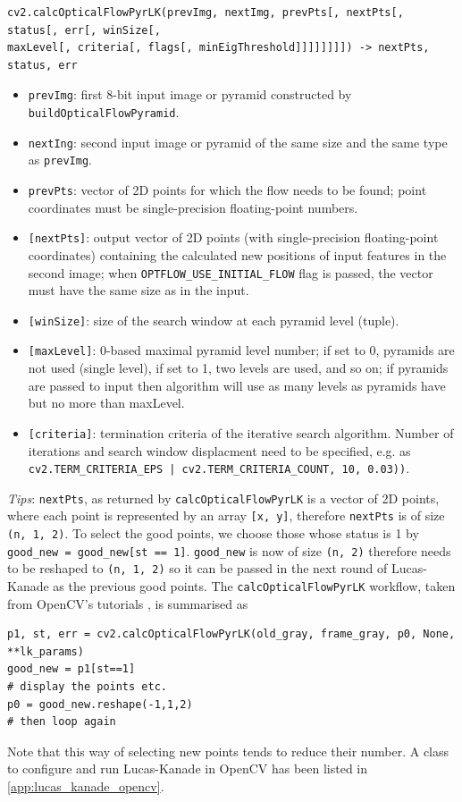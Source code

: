 \documentclass[a4paper]{article}
\begin{document}
\begin{verbatim}
cv2.calcOpticalFlowPyrLK(prevImg, nextImg, prevPts[, nextPts[, status[, err[, winSize[,
maxLevel[, criteria[, flags[, minEigThreshold]]]]]]]]) -> nextPts, status, err
\end{verbatim}
\begin{itemize}
    \item \texttt{prevImg}: first 8-bit input image or pyramid constructed by \texttt{buildOpticalFlowPyramid}. 
    \item \texttt{nextIng}: second input image or pyramid of the same size and the same type as \texttt{prevImg}. 
    \item \texttt{prevPts}: vector of 2D points for which the flow needs to be found; point coordinates must be single-precision floating-point numbers. 
    \item \texttt{[nextPts]}: output vector of 2D points (with single-precision floating-point coordinates) containing the calculated new positions of input features in the second image; when \texttt{OPTFLOW_USE_INITIAL_FLOW} flag is passed, the vector must have the same size as in the input. 
    \item \texttt{[winSize]}: size of the search window at each pyramid level (tuple).
    \item \texttt{[maxLevel]}: 0-based maximal pyramid level number; if set to 0, pyramids are not used (single level), if set to 1, two levels are used, and so on; if pyramids are passed to input then algorithm will use as many levels as pyramids have but no more than maxLevel.
    \item \texttt{[criteria]}: termination criteria of the iterative search algorithm. Number of iterations and search window displacment need to be specified, e.g. as \texttt{cv2.TERM_CRITERIA_EPS | cv2.TERM_CRITERIA_COUNT, 10, 0.03))}. 
\end{itemize}
\textit{Tips}: \texttt{nextPts}, as returned by \texttt{calcOpticalFlowPyrLK} is a vector of 2D points, where each point is represented by an array \texttt{[x, y]}, therefore \texttt{nextPts} is of size \texttt{(n, 1, 2)}. To select the good points, we choose those whose status is 1 by  \texttt{good_new = good_new[st == 1]}. \texttt{good_new} is now of size \texttt{(n, 2)} therefore needs to be reshaped to \texttt{(n, 1, 2)} so it can be passed in the next round of Lucas-Kanade as the previous good points. The \texttt{calcOpticalFlowPyrLK} workflow, taken from OpenCV's tutorials \cite{docopencvoptflow}, is summarised as
\begin{verbatim}
p1, st, err = cv2.calcOpticalFlowPyrLK(old_gray, frame_gray, p0, None, **lk_params)
good_new = p1[st==1]
# display the points etc.
p0 = good_new.reshape(-1,1,2)
# then loop again
\end{verbatim}
Note that this way of selecting new points tends to reduce their number. A class to configure and run Lucas-Kanade in OpenCV has been listed in \ref{app:lucas_kanade_opencv}.
\end{document}
